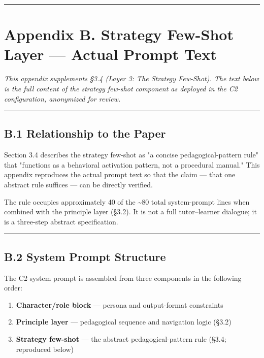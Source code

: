 \documentclass[
]{article}
\providecommand{\tightlist}{%
  \setlength{\itemsep}{0pt}\setlength{\parskip}{0pt}}
\begin{document}
\begin{center}\rule{0.5\linewidth}{0.5pt}\end{center}

\section{Appendix B. Strategy Few-Shot Layer --- Actual Prompt Text}\label{appendix-b-strategy-few-shot-layer--actual-prompt-text}

\emph{This appendix supplements §3.4 (Layer 3: The Strategy Few-Shot). The text below is the full content of the strategy few-shot component as deployed in the C2 configuration, anonymized for review.}

\begin{center}\rule{0.5\linewidth}{0.5pt}\end{center}

\subsection{B.1 Relationship to the Paper}\label{b1-relationship-to-the-paper}

Section 3.4 describes the strategy few-shot as "a concise pedagogical-pattern rule" that "functions as a behavioral activation pattern, not a procedural manual." This appendix reproduces the actual prompt text so that the claim --- that one abstract rule suffices --- can be directly verified.

The rule occupies approximately 40 of the \textasciitilde80 total system-prompt lines when combined with the principle layer (§3.2). It is not a full tutor--learner dialogue; it is a three-step abstract specification.

\begin{center}\rule{0.5\linewidth}{0.5pt}\end{center}

\subsection{B.2 System Prompt Structure}\label{b2-system-prompt-structure}

The C2 system prompt is assembled from three components in the following order:

\begin{enumerate}
\def\labelenumi{\arabic{enumi}.}
\tightlist
\item
  \textbf{Character/role block} --- persona and output-format constraints
\item
  \textbf{Principle layer} --- pedagogical sequence and navigation logic (§3.2)
\item
  \textbf{Strategy few-shot} --- the abstract pedagogical-pattern rule (§3.4; reproduced below)
\end{enumerate}
\end{document}
